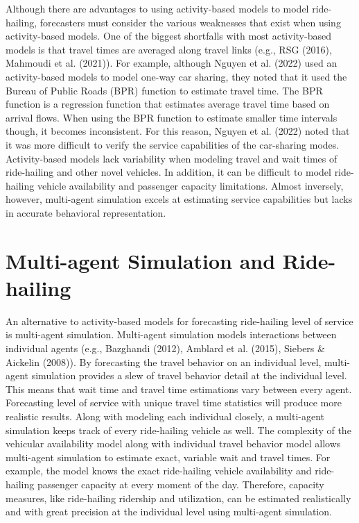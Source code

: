 \documentclass[fancy, masters]{byuthesis}
\begin{document}
Although there are advantages to using activity-based models to model ride-hailing, forecasters must consider the various weaknesses that exist when using activity-based models. One of the biggest shortfalls with most activity-based models is that travel times are averaged along travel links (e.g., RSG (2016), Mahmoudi et al. (2021)). For example, although Nguyen et al. (2022) used an activity-based models to model one-way car sharing, they noted that it used the Bureau of Public Roads (BPR) function to estimate travel time. The BPR function is a regression function that estimates average travel time based on arrival flows. When using the BPR function to estimate smaller time intervals though, it becomes inconsistent. For this reason, Nguyen et al. (2022) noted that it was more difficult to verify the service capabilities of the car-sharing modes. Activity-based models lack variability when modeling travel and wait times of ride-hailing and other novel vehicles. In addition, it can be difficult to model ride-hailing vehicle availability and passenger capacity limitations. Almost inversely, however, multi-agent simulation excels at estimating service capabilities but lacks in accurate behavioral representation.

\hypertarget{lit-mas}{%
\section{Multi-agent Simulation and Ride-hailing}\label{lit-mas}}

An alternative to activity-based models for forecasting ride-hailing level of service is multi-agent simulation. Multi-agent simulation models interactions between individual agents (e.g., Bazghandi (2012), Amblard et al. (2015), Siebers \& Aickelin (2008)). By forecasting the travel behavior on an individual level, multi-agent simulation provides a slew of travel behavior detail at the individual level. This means that wait time and travel time estimations vary between every agent. Forecasting level of service with unique travel time statistics will produce more realistic results. Along with modeling each individual closely, a multi-agent simulation keeps track of every ride-hailing vehicle as well. The complexity of the vehicular availability model along with individual travel behavior model allows multi-agent simulation to estimate exact, variable wait and travel times. For example, the model knows the exact ride-hailing vehicle availability and ride-hailing passenger capacity at every moment of the day. Therefore, capacity measures, like ride-hailing ridership and utilization, can be estimated realistically and with great precision at the individual level using multi-agent simulation.
\end{document}
